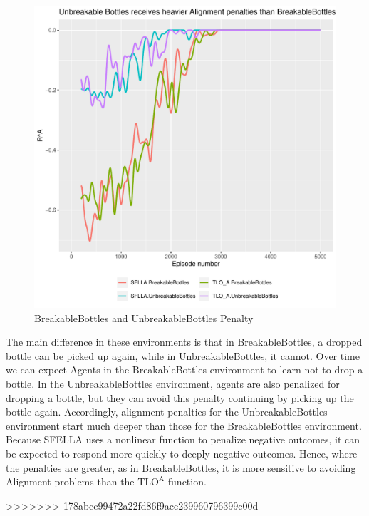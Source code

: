 \begin{figure}
  \includegraphics[width=\columnwidth]{output/penalty_plot2.pdf}
  \caption{BreakableBottles and UnbreakableBottles Penalty
  }
   \label{fig:online_performance}
 \end{figure}
 
The main difference in these environments is that in BreakableBottles, a dropped bottle can be picked up again, while in UnbreakableBottles, it cannot. Over time we can expect Agents in the BreakableBottles environment to learn not to drop a bottle. In the UnbreakableBottles environment, agents are also penalized for dropping a bottle, but they can avoid this penalty continuing by picking up the bottle again. Accordingly, alignment penalties for the UnbreakableBottles environment start much deeper than those for the BreakableBottles environment. Because SFELLA uses a nonlinear function to penalize negative outcomes, it can be expected to respond more quickly to deeply negative outcomes. Hence, where the penalties are greater, as in BreakableBottles, it is more sensitive to avoiding Alignment problems than the $\text{TLO}^\text{A}$ function.

>>>>>>> 178abcc99472a22fd86f9ace239960796399c00d



